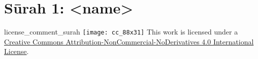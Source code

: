 \begin{comment}
The following strings are to be replaced by a script, in order to use this file as a template (all upper case):-
* sNO = sūrah number, without leading zeros
* sZO = sūrah number, with leading zeros
\end{comment}
\begin{comment}
The following tags are declared here:-
license_comment_surah
\end{comment}
\section{Sūrah 1: <name>}
\END

\begin{taggedblock}{license_comment_surah}
\texttt{[image: cc\_88x31]}
This work is licensed under a 
\href{http://creativecommons.org/licenses/by-nc-nd/4.0/}{Creative Commons Attribution-NonCommercial-NoDerivatives 4.0 International License}.
\end{taggedblock}